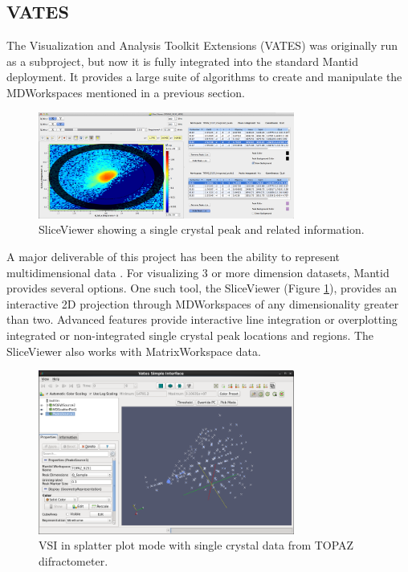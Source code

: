 \documentclass{elsarticle}
\begin{document}
\subsection{VATES}
\label{VATES}


The Visualization and Analysis Toolkit Extensions (VATES) was originally run as a subproject, but now it is fully integrated into the standard Mantid deployment. It provides a large suite of algorithms to create and manipulate the MDWorkspaces mentioned in a previous section.
\begin{figure}[hb]
\centerline{\includegraphics[width=0.75\textwidth]{Peaks_view.png}}
\caption{SliceViewer showing a single crystal peak and related information.}
\label{fig:SliceView}
\end{figure}

A major deliverable of this project has been the ability to represent multidimensional data \cite{Mslice, DAVE, Horace}. For visualizing 3 or more dimension datasets, Mantid provides several options. One such tool, the SliceViewer (Figure \ref{fig:SliceView}), provides an interactive 2D projection through MDWorkspaces of any dimensionality greater than two. Advanced features provide interactive line integration or overplotting integrated or non-integrated single crystal peak locations and regions. The SliceViewer also works with MatrixWorkspace data. 

\begin{figure}[ht]
\centerline{\includegraphics[width=0.75\textwidth]{VSI-v2-SplatterPlot.png}}
\caption{VSI in splatter plot mode with single crystal data from TOPAZ difractometer.}
\label{fig:VSI_sample}
\end{figure}
\end{document}
